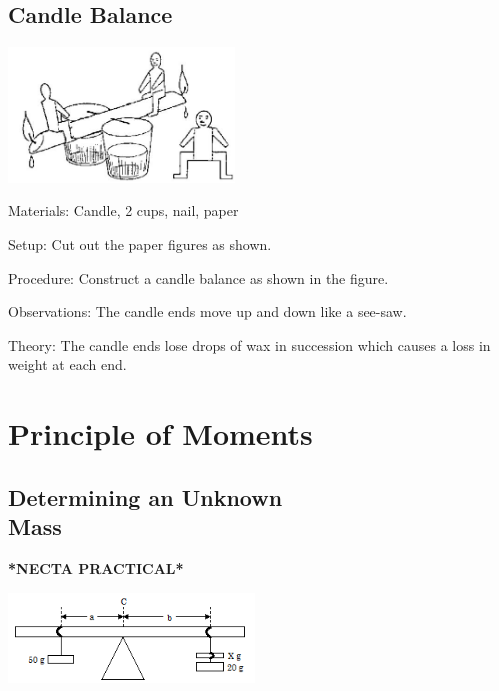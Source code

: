 \begin{multicols}{2}
\subsection{Candle Balance}

\begin{center}
\includegraphics[width=0.45\textwidth]{./img/source/candle-balance.jpg}
\end{center}

\begin{description*}
\item[Materials:]{Candle, 2 cups, nail, paper}
\item[Setup:]{Cut out the paper figures as shown.}
\item[Procedure:]{Construct a candle balance as shown in the figure.}
\item[Observations:]{The candle ends move up and down like a see-saw.}
\item[Theory:]{The candle ends lose drops of wax in
succession which causes a loss in weight at each
end.}
\end{description*}

\columnbreak


\section*{Principle of Moments}


\subsection{Determining an Unknown \hfill \\ Mass}
\textbf{*NECTA PRACTICAL*}

\begin{center}
\includegraphics[width=0.49\textwidth]{./img/unknown-mass.png}
\end{center}


\end{multicols}
